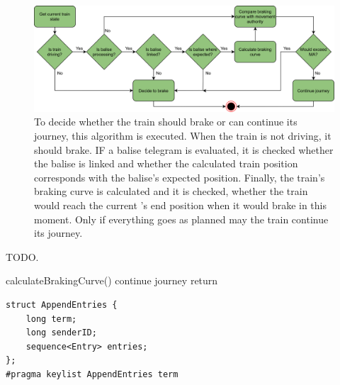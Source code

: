 \iffalse






\begin{figure}[!hb]
	\centering
	\includegraphics[width=0.75\linewidth]{images/DecisionMaking}
	\caption{To decide whether the train should brake or can continue its journey, this algorithm is executed. When the train is not driving, it should brake. IF a balise telegram is evaluated, it is checked whether the balise is linked and whether the calculated train position corresponds with the balise's expected position. Finally, the train's braking curve is calculated and it is checked, whether the train would reach the current 's end position when it would brake in this moment. Only if everything goes as planned may the train continue its journey.}
	\label{fig:DecisionMaking}
\end{figure}

\begin{algorithm}[H]\caption{TODO.}\label{algo:DecisionMaking}

\BlankLine

calculateBrakingCurve()\;
continue journey\;
return\;
\end{algorithm}





\lstset{language=C}
\begin{lstlisting}[caption={\abr{IDL} definition for the \texttt{AppendEntries} topic. The \texttt{term} variable represents the latest term that the replica has seen, while the \texttt{senderID} encodes which replica sent this message. With \texttt{entries}, a payload can be send via the topic. This is used by a leader for instructing its followers to process certain data. The \texttt{entries} field is left empty for heartbeat messages.}, label=code:appendEntries]
struct AppendEntries {
    long term;
    long senderID;
    sequence<Entry> entries;
};
#pragma keylist AppendEntries term
\end{lstlisting}


